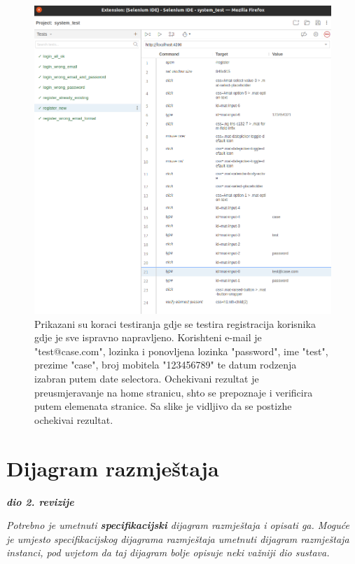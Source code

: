 {            \begin{figure}[H]
                \includegraphics[width=\textwidth]{slike/tests_system/register_new.png} %
                \caption{Prikazani su koraci testiranja gdje se testira registracija korisnika gdje je sve ispravno napravljeno. Korishteni e-mail je "test@case.com", lozinka i ponovljena lozinka "password", ime "test", prezime "case", broj mobitela "123456789" te datum rodzenja izabran putem date selectora. Ochekivani rezultat je preusmjeravanje na home stranicu, shto se prepoznaje i verificira putem elemenata stranice. Sa slike je vidljivo da se postizhe ochekivai rezultat.}
                \label{fig:struktura} %
            \end{figure}
		
		\section{Dijagram razmještaja}
			
			\textbf{\textit{dio 2. revizije}}
			
			 \textit{Potrebno je umetnuti \textbf{specifikacijski} dijagram razmještaja i opisati ga. Moguće je umjesto specifikacijskog dijagrama razmještaja umetnuti dijagram razmještaja instanci, pod uvjetom da taj dijagram bolje opisuje neki važniji dio sustava.}
			
}
